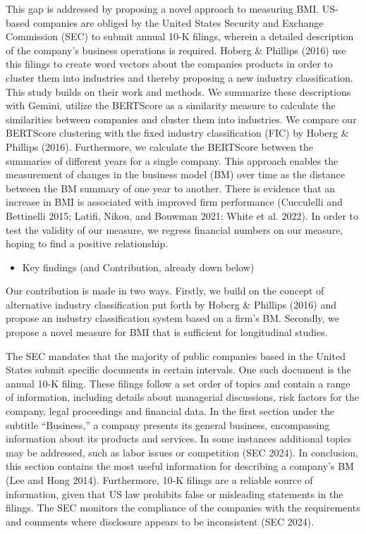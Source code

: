 \documentclass[
]{article}
\providecommand{\tightlist}{%
  \setlength{\itemsep}{0pt}\setlength{\parskip}{0pt}}\usepackage{longtable,booktabs,array}
\begin{document}
This gap is addressed by proposing a novel approach to measuring BMI.
US-based companies are obliged by the United States Security and
Exchange Commission (SEC) to submit annual 10-K filings, wherein a
detailed description of the company's business operations is required.
Hoberg \& Phillips (2016) use this filings to create word vectors about
the companies products in order to cluster them into industries and
thereby proposing a new industry classification. This study builds on
their work and methods. We summarize these descriptions with Gemini,
utilize the BERTScore as a similarity measure to calculate the
similarities between companies and cluster them into industries. We
compare our BERTScore clustering with the fixed industry classification
(FIC) by Hoberg \& Phillips (2016). Furthermore, we calculate the
BERTScore between the summaries of different years for a single company.
This approach enables the measurement of changes in the business model
(BM) over time as the distance between the BM summary of one year to
another. There is evidence that an increase in BMI is associated with
improved firm performance (Cucculelli and Bettinelli 2015; Latifi,
Nikou, and Bouwman 2021; White et al. 2022). In order to test the
validity of our measure, we regress financial numbers on our measure,
hoping to find a positive relationship.

\begin{itemize}
\tightlist
\item
  Key findings (and Contribution, already down below)
\end{itemize}

Our contribution is made in two ways. Firstly, we build on the concept
of alternative industry classification put forth by Hoberg \& Phillips
(2016) and propose an industry classification system based on a firm's
BM. Secondly, we propose a novel measure for BMI that is sufficient for
longitudinal studies.

The SEC mandates that the majority of public companies based in the
United States submit specific documents in certain intervals. One such
document is the annual 10-K filing. These filings follow a set order of
topics and contain a range of information, including details about
managerial discussions, risk factors for the company, legal proceedings
and financial data. In the first section under the subtitle
``Business,'' a company presents its general business, encompassing
information about its products and services. In some instances
additional topics may be addressed, such as labor issues or competition
(SEC 2024). In conclusion, this section contains the most useful
information for describing a company's BM (Lee and Hong 2014).
Furthermore, 10-K filings are a reliable source of information, given
that US law prohibits false or misleading statements in the filings. The
SEC monitors the compliance of the companies with the requirements and
comments where disclosure appears to be inconsistent (SEC 2024).
\end{document}
